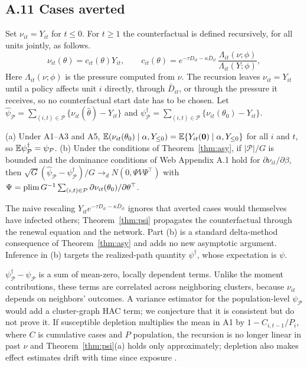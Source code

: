 \subsection{A.11 Cases averted}

Set $\nu_{it}=Y_{it}$ for $t\le 0$. For $t\ge 1$ the counterfactual is defined recursively, for all units jointly, as follows.
\begin{equation}
\nu_{it}(\theta)=c_{it}(\theta)Y_{it},\qquad
c_{it}(\theta)=e^{-\tau D_{it}-\kappa\bar D_{it}}\,\frac{\Lambda_{it}(\nu;\phi)}{\Lambda_{it}(Y;\phi)},
\label{eq:nu}
\end{equation}
Here $\Lambda_{it}(\nu;\phi)$ is the pressure computed from $\nu$. The recursion leaves
$\nu_{it}=Y_{it}$ until a policy affects unit $i$ directly, through $\bar D_{it}$, or through the
pressure it receives, so no counterfactual start date has to be chosen. Let $\hat\psi_{\mathcal P}=\sum_{(i,t)\in\mathcal P}\{\nu_{it}(\hat\theta)-Y_{it}\}$
and $\psi^\dagger_{\mathcal P}=\sum_{(i,t)\in\mathcal P}\{\nu_{it}(\theta_0)-Y_{it}\}$.

\begin{theorem}
\label{thm:psi}
(a) Under A1--A3 and A5, $\mathbb{E}(\nu_{it}(\theta_0)\mid\alpha,Y_{\le 0})=\mathbb{E}\{Y_{it}(\mathbf 0)\mid\alpha,Y_{\le 0}\}$
for all $i$ and $t$, so $\mathbb{E}\psi^\dagger_{\mathcal P}=\psi_{\mathcal P}$.
(b) Under the conditions of Theorem~\ref{thm:asy}, if $|\mathcal P|/G$ is bounded and the
dominance conditions of Web Appendix A.1 hold for $\partial\nu_{it}/\partial\beta$, then
$\sqrt G(\hat\psi_{\mathcal P}-\psi^\dagger_{\mathcal P})/G\to_d N(0,\Psi V\Psi^{\top})$ with
$\Psi=\operatorname*{plim} G^{-1}\sum_{(i,t)\in\mathcal P}\partial\nu_{it}(\theta_0)/\partial\theta^{\top}$.
\end{theorem}

The naive rescaling $Y_{it}e^{-\tau D_{it}-\kappa\bar D_{it}}$ ignores that averted cases would
themselves have infected others; Theorem~\ref{thm:psi} propagates the counterfactual through the
renewal equation and the network. Part (b) is a standard delta-method consequence of
Theorem~\ref{thm:asy} and adds no new asymptotic argument. Inference in (b) targets the realized-path quantity
$\psi^\dagger$, whose expectation is $\psi$.

\begin{remark}
\label{rem:psi}
$\psi^\dagger_{\mathcal P}-\psi_{\mathcal P}$ is a sum of mean-zero, locally dependent terms.
Unlike the moment contributions, these terms are correlated across neighboring clusters, because
$\nu_{it}$ depends on neighbors' outcomes. A variance estimator for the population-level
$\psi_{\mathcal P}$ would add a cluster-graph HAC term; we conjecture that it is consistent but do
not prove it. If susceptible depletion multiplies the mean in A1 by
$1-C_{i,t-1}/P_i$, where $C$ is cumulative cases and $P$ population, the recursion is no longer
linear in past $\nu$ and Theorem~\ref{thm:psi}(a) holds only approximately; depletion also makes
effect estimates drift with time since exposure \citep{janvin2025depletion}.
\end{remark}

